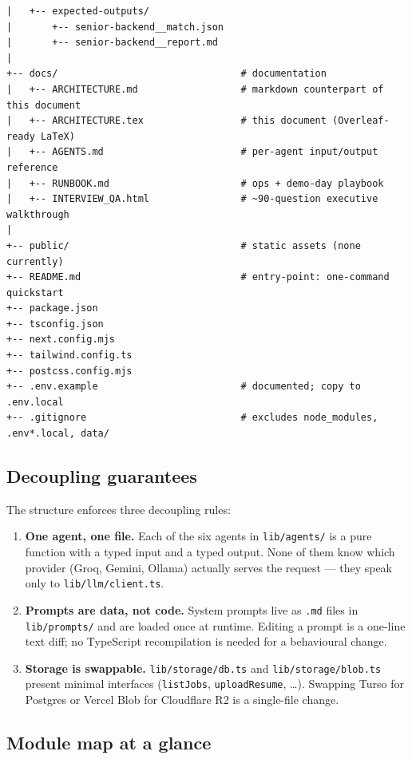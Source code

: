 \documentclass[11pt,a4paper]{article}
\begin{document}
\begin{lstlisting}[basicstyle=\ttfamily\scriptsize]
|   +-- expected-outputs/
|       +-- senior-backend__match.json
|       +-- senior-backend__report.md
|
+-- docs/                                # documentation
|   +-- ARCHITECTURE.md                  # markdown counterpart of this document
|   +-- ARCHITECTURE.tex                 # this document (Overleaf-ready LaTeX)
|   +-- AGENTS.md                        # per-agent input/output reference
|   +-- RUNBOOK.md                       # ops + demo-day playbook
|   +-- INTERVIEW_QA.html                # ~90-question executive walkthrough
|
+-- public/                              # static assets (none currently)
+-- README.md                            # entry-point: one-command quickstart
+-- package.json
+-- tsconfig.json
+-- next.config.mjs
+-- tailwind.config.ts
+-- postcss.config.mjs
+-- .env.example                         # documented; copy to .env.local
+-- .gitignore                           # excludes node_modules, .env*.local, data/
\end{lstlisting}

\subsection{Decoupling guarantees}

The structure enforces three decoupling rules:

\begin{enumerate}
  \item \textbf{One agent, one file.} Each of the six agents in
        \texttt{lib/agents/} is a pure function with a typed input and a
        typed output. None of them know which provider (Groq, Gemini,
        Ollama) actually serves the request --- they speak only to
        \texttt{lib/llm/client.ts}.
  \item \textbf{Prompts are data, not code.} System prompts live as
        \texttt{.md} files in \texttt{lib/prompts/} and are loaded once
        at runtime. Editing a prompt is a one-line text diff; no TypeScript
        recompilation is needed for a behavioural change.
  \item \textbf{Storage is swappable.} \texttt{lib/storage/db.ts} and
        \texttt{lib/storage/blob.ts} present minimal interfaces
        (\texttt{listJobs}, \texttt{uploadResume}, \ldots). Swapping
        Turso for Postgres or Vercel Blob for Cloudflare R2 is a
        single-file change.
\end{enumerate}

\subsection{Module map at a glance}
\end{document}
